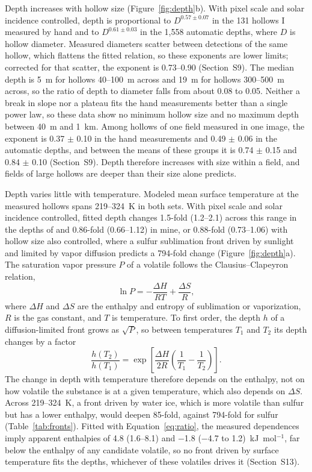 \documentclass[article,review]{planetary}
\begin{document}
Depth increases with hollow size (Figure~\ref{fig:depth}b). With pixel scale and solar incidence controlled, depth is proportional to $D^{0.57 \pm 0.07}$ in the 131 hollows I measured by hand and to $D^{0.61 \pm 0.03}$ in the 1,558 automatic depths, where $D$ is hollow diameter. Measured diameters scatter between detections of the same hollow, which flattens the fitted relation, so these exponents are lower limits; corrected for that scatter, the exponent is 0.73--0.90 (Section~S9). The median depth is 5~m for hollows 40--100~m across and 19~m for hollows 300--500~m across, so the ratio of depth to diameter falls from about 0.08 to 0.05. Neither a break in slope nor a plateau fits the hand measurements better than a single power law, so these data show no minimum hollow size and no maximum depth between 40~m and 1~km. Among hollows of one field measured in one image, the exponent is 0.37 $\pm$ 0.10 in the hand measurements and 0.49 $\pm$ 0.06 in the automatic depths, and between the means of these groups it is 0.74 $\pm$ 0.15 and 0.84 $\pm$ 0.10 (Section~S9). Depth therefore increases with size within a field, and fields of large hollows are deeper than their size alone predicts.

Depth varies little with temperature. Modeled mean surface temperature at the measured hollows spans 219--324~K in both sets. With pixel scale and solar incidence controlled, fitted depth changes 1.5-fold (1.2--2.1) across this range in the depths of \textcite{blewett2016} and 0.86-fold (0.66--1.12) in mine, or 0.88-fold (0.73--1.06) with hollow size also controlled, where a sulfur sublimation front driven by sunlight and limited by vapor diffusion \parencite{phillips2021} predicts a 794-fold change (Figure~\ref{fig:depth}a). The saturation vapor pressure $P$ of a volatile follows the Clausius--Clapeyron relation,
\begin{equation}
    \ln P = -\frac{\Delta H}{RT} + \frac{\Delta S}{R},
    \label{eq:cc}
\end{equation}
where $\Delta H$ and $\Delta S$ are the enthalpy and entropy of sublimation or vaporization, $R$ is the gas constant, and $T$ is temperature. To first order, the depth $h$ of a diffusion-limited front grows as $\sqrt{P}$, so between temperatures $T_1$ and $T_2$ its depth changes by a factor
\begin{equation}
    \frac{h(T_2)}{h(T_1)} = \exp\left[\frac{\Delta H}{2R}\left(\frac{1}{T_1} - \frac{1}{T_2}\right)\right].
    \label{eq:ratio}
\end{equation}
The change in depth with temperature therefore depends on the enthalpy, not on how volatile the substance is at a given temperature, which also depends on $\Delta S$. Across 219--324~K, a front driven by water ice, which is more volatile than sulfur but has a lower enthalpy, would deepen 85-fold, against 794-fold for sulfur (Table~\ref{tab:fronts}). Fitted with Equation~\ref{eq:ratio}, the measured dependences imply apparent enthalpies of 4.8 (1.6--8.1) and $-$1.8 ($-$4.7 to 1.2)~kJ~mol$^{-1}$, far below the enthalpy of any candidate volatile, so no front driven by surface temperature fits the depths, whichever of these volatiles drives it (Section~S13).
\end{document}
